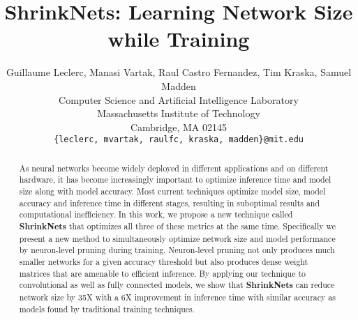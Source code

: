 \documentclass{article}
\title{ShrinkNets: Learning Network Size while Training}
\author{
  Guillaume Leclerc, Manasi Vartak, Raul Castro Fernandez, Tim Kraska, Samuel Madden \\
  Computer Science and Artificial Intelligence Laboratory\\
  Massachusetts Institute of Technology\\
  Cambridge, MA 02145 \\
  \texttt{\{leclerc, mvartak, raulfc, kraska, madden\}@mit.edu} \\
}
\newcommand{\shrink}{{\bf ShrinkNets}\xspace}
\begin{document}

\maketitle

\begin{abstract}
As neural networks become widely deployed in different applications and on
different hardware, it has become increasingly important to optimize inference
time and model size along with model accuracy.  Most current techniques
optimize model size, model accuracy and inference time in different stages,
resulting in suboptimal results and computational inefficiency.  In this work,
we propose a new technique called \shrink that optimizes all three of these
metrics at the same time.  Specifically we present a new method to
simultaneously optimize network size and model performance by neuron-level
pruning during training.  Neuron-level pruning not only produces much smaller
networks for a given accuracy threshold but also produces dense weight matrices
that are amenable to efficient inference.  By applying our technique to
convolutional as well as fully connected models, we show that \shrink can
reduce network size by 35X with a 6X improvement in inference time with similar
accuracy as models found by traditional training techniques. 
\end{abstract}







\FloatBarrier



\end{document}
